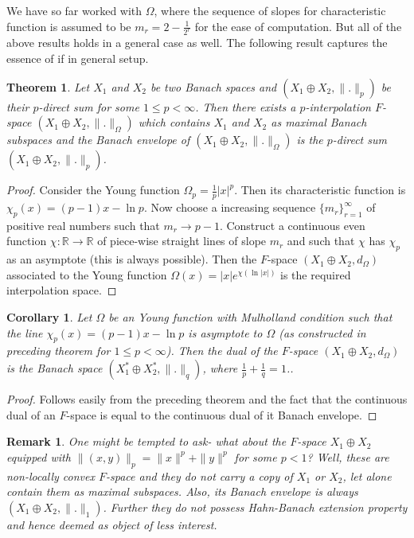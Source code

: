 \documentclass[pdflatex,sn-mathphys-num]{sn-jnl}%
\newtheorem{remark}{Remark}
\theoremstyle{thmstyleone}%
\newtheorem{theorem}{Theorem}%
\theoremstyle{thmstyletwo}%
\theoremstyle{thmstylethree}%
\newtheorem{corollary}{Corollary}
\begin{document}
	 We have so far worked with $\Omega$, where the sequence of slopes for characteristic function is assumed to be $m_r=2-\frac{1}{2^r}$ for the ease of computation. But all of the above results holds in a general case as well. The following result captures the essence of if in general setup.
	\begin{theorem}
Let $X_1$ and $X_2$ be two Banach spaces and $\left(X_1\oplus X_2,\|.\|_p\right)$ be their $p$-direct sum for some $1\leq p<\infty$. Then there exists a $p$-interpolation $F$-space $\left(X_1\oplus X_2,\|.\|_\Omega\right)$ which contains $X_1$ and $X_2$ as maximal Banach subspaces and the Banach envelope of $\left(X_1\oplus X_2,\|.\|_\Omega\right)$ is the $p$-direct sum  $\left(X_1\oplus X_2,\|.\|_p\right)$.
	\end{theorem}
	\begin{proof}
		Consider the Young function $\Omega_p=\frac{1}{p}|x|^p$. Then its characteristic function is $\chi_p(x)=(p-1)x-\ln p$. Now choose a increasing sequence $\{m_r\}_{r=1}^\infty$ of positive real numbers such that $m_r\to p-1$. Construct a continuous even function $\chi:\mathbb R\to \mathbb R$ of piece-wise straight lines of slope $m_r$ and such that $\chi$ has $\chi_p$ as an asymptote (this is always possible). Then the $F$-space $\left(X_1\oplus X_2,d_{\Omega}\right)$ associated to the Young function $\Omega(x)=|x|e^{\chi(\ln |x|)}$ is the required interpolation space.
	\end{proof}
	\begin{corollary}
		Let $\Omega$ be an Young function with Mulholland condition such that the line $\chi_p(x)=(p-1)x-\ln p$ is asymptote to $\Omega$ (as constructed in preceding theorem for $1\leq p<\infty$). Then the dual of the $F$-space $\left(X_1\oplus X_2,d_\Omega\right)$ is the Banach space $\left(X_1^*\oplus X_2^*, \|.\|_q\right)$, where $\frac{1}{p}+\frac{1}{q}=1$..
	\end{corollary}
	\begin{proof}
		Follows easily from the preceding theorem and the fact that the continuous dual of an $F$-space is equal to the continuous dual of it  Banach envelope.
	\end{proof}
	\begin{remark}
		One might be tempted to ask- what about the $F$-space $X_1\oplus X_2$ equipped with $\|(x,y)\|_p=\|x\|^p+\|y\|^p$ for some $p< 1$? Well, these are non-locally convex $F$-space and they do not carry a copy of $X_1$ or $X_2$, let alone contain them as maximal subspaces. Also, its Banach envelope is always $\left(X_1\oplus X_2,\|.\|_1\right)$. Further they do not possess Hahn-Banach extension property and hence deemed as object of less interest. 
	\end{remark}
\end{document}
